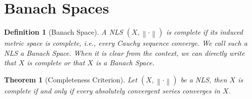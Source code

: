 \documentclass[12pt]{article}
\newtheorem*{theorem}{Theorem}
\newtheorem*{definition}{Definition}
\newcommand{\norm}[1]{\left\lVert#1 \right\rVert}
\begin{document}
\section{Banach Spaces}

\begin{definition}[Banach Space]
    A NLS $(X, \norm{\cdot})$ is complete if its induced metric space is complete, i.e., every Cauchy sequence converge. We call such a NLS a Banach Space. When it is clear from the context, we can directly write that $X$ is complete or that $X$ is a Banach Space.
\end{definition}

\begin{theorem}[Completeness Criterion]
    Let $(X, \norm{\cdot})$ be a NLS, then $X$ is complete if and only if every absolutely convergent series converges in $X$.
\end{theorem}
\end{document}

